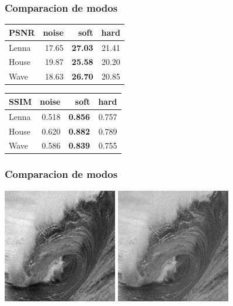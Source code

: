 \documentclass{beamer}
\begin{document}
  \begin{frame}
    \frametitle{ Comparacion de modos }
    \centering
    \begin{tabular}{lrrr}
      \toprule
      {PSNR} &  noise &   soft &   hard \\
      \midrule
      Lenna &  17.65 &  \bf{27.03} &  21.41 \\
      House &  19.87 &  \bf{25.58} &  20.20 \\
      Wave &  18.63 &  \bf{26.70} &  20.85 \\
      \bottomrule
      \end{tabular}
      \begin{tabular}{lrrr}
        {SSIM} &  noise &   soft &   hard \\
        \midrule
        Lenna &  0.518 &  \bf{0.856} &  0.757 \\
        House &  0.620 &  \bf{0.882} &  0.789 \\
        Wave &  0.586 &  \bf{0.839} &  0.755 \\
        \bottomrule
        \end{tabular}

  \end{frame}

  \begin{frame}
    \frametitle{ Comparacion de modos }
    \centering
    \includegraphics[width=5cm]{imgs/Modes/2_normal_soft_sym8_Wave.jpg}
    \includegraphics[width=5cm]{imgs/Modes/2_normal_hard_sym8_Wave.jpg}

  \end{frame}
\end{document}
